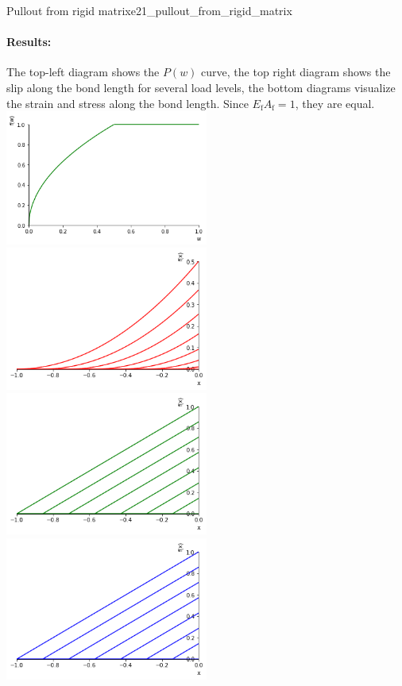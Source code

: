 \documentclass[main.tex]{subfiles}
\begin{document}
\begin{bmcsex}{Pullout from rigid matrix}{e21_pullout_from_rigid_matrix}
\paragraph{Results:} The top-left diagram shows the $P(w)$ curve, 
the top right diagram shows the slip along the 
bond length for several load levels, 
the bottom diagrams visualize 
the strain and stress along the bond length.
Since $E_\mathrm{f}A_\mathrm{f} = 1$, they are equal.\\
\includegraphics[clip,width=0.5\textwidth]
{bmcsex/ex21_pullout_from_rigid_matrix/ex21_pullout.png}
\includegraphics[clip,width=0.5\textwidth]
{bmcsex/ex21_pullout_from_rigid_matrix/ex21_slip_profile.png}
\includegraphics[clip,width=0.5\textwidth]
{bmcsex/ex21_pullout_from_rigid_matrix/ex21_strain_profile.png}
\includegraphics[clip,width=0.5\textwidth]
{bmcsex/ex21_pullout_from_rigid_matrix/ex21_stress_profile.png}


\end{bmcsex}
\end{document}
